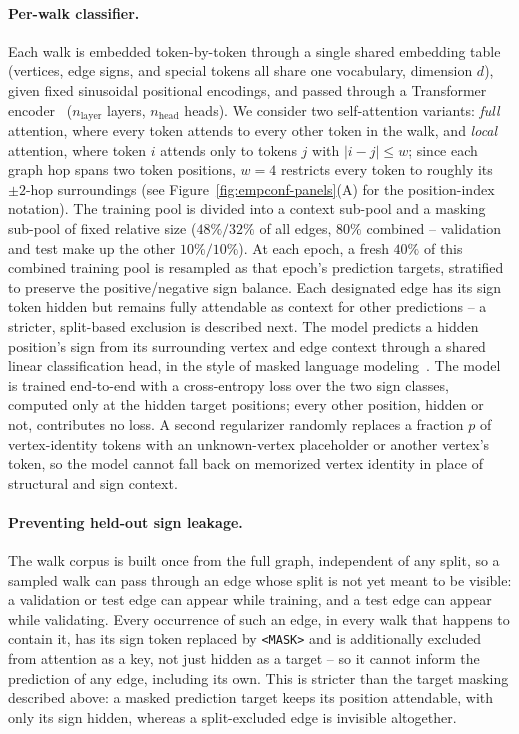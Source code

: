 \documentclass[sigconf, review, anonymous]{acmart}
\theoremstyle{plain}
\theoremstyle{definition}
\begin{document}
\paragraph{Per-walk classifier.} Each walk is embedded token-by-token through a single shared embedding table (vertices, edge signs, and special tokens all share one vocabulary, dimension $d$), given fixed sinusoidal positional encodings, and passed through a Transformer encoder~\citep{vaswani2017attention} ($n_\text{layer}$ layers, $n_\text{head}$ heads). We consider two self-attention variants: \emph{full} attention, where every token attends to every other token in the walk, and \emph{local} attention, where token $i$ attends only to tokens $j$ with $|i-j|\le w$; since each graph hop spans two token positions, $w=4$ restricts every token to roughly its $\pm2$-hop surroundings (see Figure~\ref{fig:empconf-panels}(A) for the position-index notation). The training pool is divided into a context sub-pool and a masking sub-pool of fixed relative size ($48\%/32\%$ of all edges, $80\%$ combined -- validation and test make up the other $10\%/10\%$). At each epoch, a fresh $40\%$ of this combined training pool is resampled as that epoch's prediction targets, stratified to preserve the positive/negative sign balance. Each designated edge has its sign token hidden but remains fully attendable as context for other predictions -- a stricter, split-based exclusion is described next. The model predicts a hidden position's sign from its surrounding vertex and edge context through a shared linear classification head, in the style of masked language modeling~\citep{devlin2019bert}. The model is trained end-to-end with a cross-entropy loss over the two sign classes, computed only at the hidden target positions; every other position, hidden or not, contributes no loss. A second regularizer randomly replaces a fraction $p$ of vertex-identity tokens with an unknown-vertex placeholder or another vertex's token, so the model cannot fall back on memorized vertex identity in place of structural and sign context.

\paragraph{Preventing held-out sign leakage.} The walk corpus is built once from the full graph, independent of any split, so a sampled walk can pass through an edge whose split is not yet meant to be visible: a validation or test edge can appear while training, and a test edge can appear while validating. Every occurrence of such an edge, in every walk that happens to contain it, has its sign token replaced by \texttt{<MASK>} and is additionally excluded from attention as a key, not just hidden as a target -- so it cannot inform the prediction of any edge, including its own. This is stricter than the target masking described above: a masked prediction target keeps its position attendable, with only its sign hidden, whereas a split-excluded edge is invisible altogether.
\end{document}

